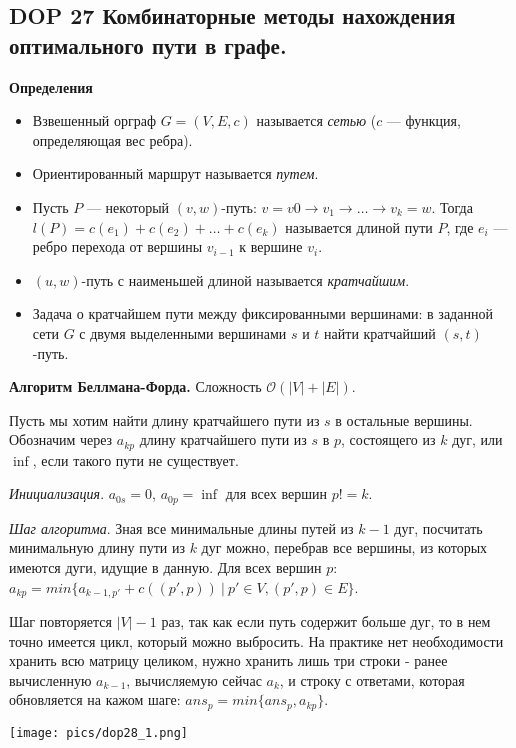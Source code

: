 \subsection{DOP 27 Комбинаторные методы нахождения оптимального пути в графе.}

\textbf{Определения}

\begin{itemize}
    \item Взвешенный орграф $G = (V, E, c)$ называется \textit{сетью} ($c$ --- функция, определяющая вес ребра).
    \item Ориентированный маршрут называется \textit{путем}. 
    \item Пусть $P$ --- некоторый $(v, w)$-путь: $v = v 0 \rightarrow v_1 \rightarrow \dots \rightarrow v_k = w$. Тогда $l(P) = c(e_1) + c(e_2) + \dots + c(e_k)$ называется длиной пути $P$, где $e_i$ --- ребро перехода от вершины $v_{i-1}$ к вершине $v_i$. 
    \item $(u, w)$-путь с наименьшей длиной называется \textit{кратчайшим}.
    \item Задача о кратчайшем пути между фиксированными вершинами: в заданной сети $G$ с двумя выделенными вершинами $s$ и $t$ найти кратчайший $(s, t)$-путь.
\end{itemize}

\textbf{Алгоритм Беллмана-Форда.} 
Сложность $\mathcal{O}(|V| + |E|)$.

Пусть мы хотим найти длину кратчайшего пути из $s$ в остальные вершины. Обозначим через $a_{kp}$ длину кратчайшего пути из $s$ в $p$, состоящего из $k$ дуг, или $\inf$, если такого пути не существует.

\textit{Инициализация}. 
$a_{0s} = 0$, $a_{0p} = \inf$ для всех вершин $p != k$.

\textit{Шаг алгоритма}.
Зная все минимальные длины путей из $k-1$ дуг, посчитать минимальную длину пути из $k$ дуг можно, перебрав все вершины, из которых имеются дуги, идущие в данную. Для всех вершин $p$: $a_{kp} = min\{a_{k-1,p'} + c((p',p))~|~p' \in V, (p',p) \in E\}$. 

Шаг повторяется $|V| - 1$ раз, так как если путь содержит больше дуг, то в нем точно имеется цикл, который можно выбросить. На практике нет необходимости хранить всю матрицу целиком, нужно хранить лишь три строки - ранее вычисленную $a_{k-1}$, вычисляемую сейчас $a_k$, и строку с ответами, которая обновляется на кажом шаге: $ans_p = min\{ans_p, a_{kp}\}$.

\texttt{[image: pics/dop28\_1.png]}

